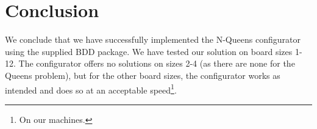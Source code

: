 \section{Conclusion}
\label{Conclusion}
We conclude that we have successfully implemented the N-Queens configurator using the supplied BDD package. We have tested our solution on board sizes 1-12. The configurator offers no solutions on sizes 2-4 (as there are none for the Queens problem), but for the other board sizes, the configurator works as intended and does so at an acceptable speed\footnote{On our machines.}.